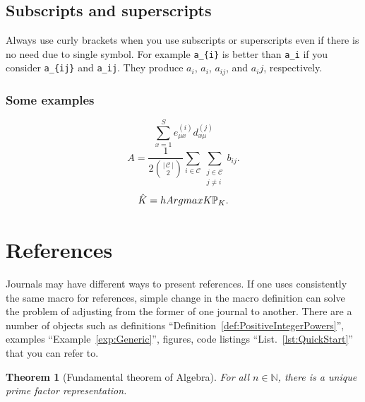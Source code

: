 \documentclass[pre,twocolumn,showkeys,longbibliography]{revtex4-1}
\newcommand{\reflst}[1]{List.~\ref{#1}}  %
\newcommand{\refdef}[1]{Definition~\ref{#1}}
\newcommand{\refexmp}[1]{Example~\ref{#1}}
\newcommand{\hAbs}[1]{\ensuremath{\left \lvert \, #1 \, \right \rvert} } %
\newcommand{\hArgmax}[2]{\underset{#1}{\operatorname{arg \, max}}\;#2}
\theoremstyle{plain}
\newtheorem{thm}{Theorem}[section]
\theoremstyle{definition}
\theoremstyle{remark}
\newcommand{\hSoN}{\mathbb{N}} %
\begin{document}
\subsection{Subscripts and superscripts}

Always use curly brackets when you use subscripts or superscripts 
even if there is no need due to single symbol.
For example \verb!a_{i}! is better than \verb!a_i! 
if you consider
\verb!a_{ij}! and \verb!a_ij!.
They produce
$a_{i}$,
$a_i$,
$a_{ij}$, and 
$a_ij$,
respectively.




\subsubsection{Some examples}

\[
	\sum_{x = 1}^{S} 
		e_{\mu x}^{(i)}
		d_{x \mu}^{(j)} 
\]
\[
	A= 	
	\frac
		{1}
		{2 {\hAbs{\mathcal{C}} \choose 2}} 
	\sum_{i \in \mathcal{C}}
	\sum_{
		\substack{
			j \in \mathcal{C}\\
			j \neq i
		}
	} 
	b_{ij}.
\]
\[
	\hat{K} =
		\\hArgmax
			{K}
			{{\mathbb{P}_{K}}}.
\]













\section{References}
\label{sec:References}

Journals may have different ways to present references. 
If one uses consistently the same macro for references,
simple change in the macro definition can solve 
the problem of adjusting from the former of one journal to another.
There are a number of objects such as 
definitions ``\refdef{def:PositiveIntegerPowers}'', 
examples ``\refexmp{exp:Generic}'',
figures, 
code listings ``\reflst{lst:QuickStart}''
 that you can refer to.

\begin{thm}[Fundamental theorem of Algebra]
	For all $n \in \hSoN$,
	there is a unique prime factor representation.
	\label{thm:PrimeFactorization}
\end{thm}
\end{document}
